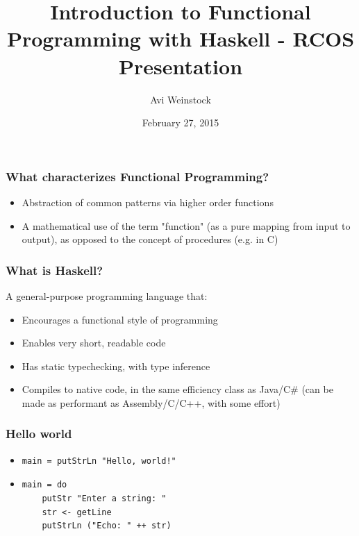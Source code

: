\documentclass{beamer}
\title{Introduction to Functional Programming with Haskell - RCOS Presentation}
\date{February 27, 2015}
\author{Avi Weinstock}
\begin{document}
\maketitle

\begin{frame}
\frametitle{What characterizes Functional Programming?}
\begin{itemize}
\item
Abstraction of common patterns via higher order functions
\item
A mathematical use of the term "function" (as a pure mapping from input to output), as opposed to the concept of procedures (e.g. in C)
\end{itemize}

\end{frame}
\begin{frame}
\frametitle{What is Haskell?}
A general-purpose programming language that:
\begin{itemize}
\item
Encourages a functional style of programming
\item
Enables very short, readable code
\item
Has static typechecking, with type inference
\item
Compiles to native code, in the same efficiency class as Java/C\# (can be made as performant as Assembly/C/C++, with some effort)
\end{itemize}
\end{frame}

\begin{frame}[fragile]
\frametitle{Hello world}
\begin{itemize}
\item
\begin{Verbatim}[frame=single, fontsize=\scriptsize]
main = putStrLn "Hello, world!"
\end{Verbatim}
\item
\begin{Verbatim}[frame=single, fontsize=\scriptsize]
main = do
    putStr "Enter a string: "
    str <- getLine
    putStrLn ("Echo: " ++ str)
\end{Verbatim}
%    
\end{itemize}
\end{frame}
\end{document}
